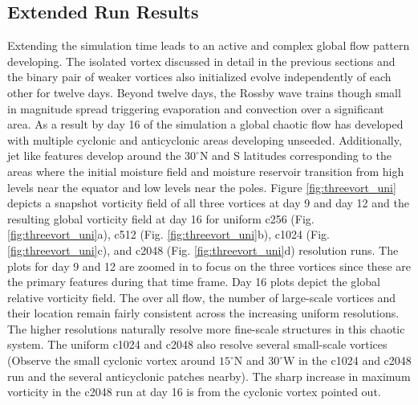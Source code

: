      \subsection{Extended Run Results}
Extending the simulation time leads to an active and complex global flow pattern developing.
The isolated vortex discussed in detail in the previous sections and the binary
pair of weaker vortices also initialized evolve independently of each other for twelve days. 
Beyond twelve days, the Rossby wave trains though small in magnitude
spread triggering evaporation and convection over a significant area.
As a result by day 16 of the simulation a global chaotic flow has developed with multiple
cyclonic and anticyclonic areas developing unseeded.  Additionally, jet like features
develop around the $30^\circ$N and S latitudes corresponding to the areas 
where the initial moisture field and moisture reservoir transition from high levels
near the equator and low levels near the poles. 
Figure \ref{fig:threevort_uni} depicts a snapshot vorticity field of all three vortices 
at day 9 and day 12 and the resulting global vorticity field at day 16
for uniform c256 (Fig. \ref{fig:threevort_uni}a), c512 (Fig. \ref{fig:threevort_uni}b),
c1024 (Fig. \ref{fig:threevort_uni}c), and c2048 (Fig. \ref{fig:threevort_uni}d) resolution
runs. The plots for day 9 and 12 are zoomed in to focus on the three vortices since
these are the primary features during that time frame. Day 16 plots depict the 
global relative vorticity field. The over all flow, the number of large-scale vortices
and their location remain fairly consistent across the increasing uniform resolutions.
The higher resolutions naturally resolve more fine-scale structures in this chaotic system.
The uniform c1024 and c2048 also resolve several small-scale vortices (Observe the small 
cyclonic vortex around $15^\circ$N and $30^\circ$W in the c1024 and c2048 run and 
the several anticyclonic patches nearby). The sharp increase in maximum vorticity
in the c2048 run at day 16 is from the cyclonic vortex pointed out.

